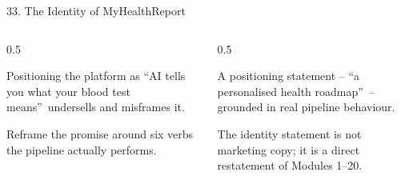 \documentclass[9pt,aspectratio=169]{beamer}
\begin{document}
\begin{frame}{33. The Identity of MyHealthReport}
\begin{columns}[T,onlytextwidth]
\begin{column}{0.5\textwidth}
\begin{tcolorbox}[colback=blue!7,colframe=blue!55!black,title=\textbf{Motivation},boxrule=0.6pt,arc=1mm,left=5pt,right=5pt,top=3pt,bottom=3pt,fonttitle=\small]
\footnotesize Positioning the platform as \textquotedblleft AI tells you what your blood test means\textquotedblright\ undersells and misframes it.
\end{tcolorbox}
\vspace{5pt}
\begin{tcolorbox}[colback=teal!7,colframe=teal!55!black,title=\textbf{Method},boxrule=0.6pt,arc=1mm,left=5pt,right=5pt,top=3pt,bottom=3pt,fonttitle=\small]
\footnotesize Reframe the promise around six verbs the pipeline actually performs.
\end{tcolorbox}
\end{column}
\begin{column}{0.5\textwidth}
\begin{tcolorbox}[colback=green!8,colframe=green!45!black,title=\textbf{Result},boxrule=0.6pt,arc=1mm,left=5pt,right=5pt,top=3pt,bottom=3pt,fonttitle=\small]
\footnotesize A positioning statement -- \textquotedblleft a personalised health roadmap\textquotedblright\ -- grounded in real pipeline behaviour.
\end{tcolorbox}
\vspace{5pt}
\begin{tcolorbox}[colback=orange!10,colframe=orange!65!black,title=\textbf{Conclusion},boxrule=0.6pt,arc=1mm,left=5pt,right=5pt,top=3pt,bottom=3pt,fonttitle=\small]
\footnotesize The identity statement is not marketing copy; it is a direct restatement of Modules 1--20.
\end{tcolorbox}
\end{column}
\end{columns}
\end{frame}
\end{document}
